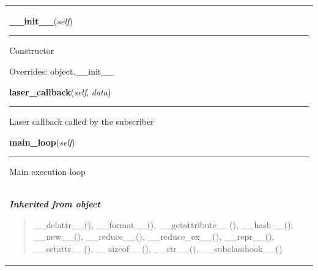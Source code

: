 \documentclass[12pt,a4paper]{scrartcl}
\newenvironment{algorithmframe}
{\begin{tabular}{|p{0.95\textwidth}}}%
{\end{tabular}}
\newlength{\funcindent}
\newlength{\funcwidth}
\begin{document}
\begin{algorithmframe}
\begin{boxedminipage}{\funcwidth}
    \raggedright \textbf{\_\_init\_\_}(\textit{self})

    \vspace{-1.5ex}

    \rule{\textwidth}{0.5\fboxrule}
\setlength{\parskip}{2ex}
    Constructor

\setlength{\parskip}{1ex}
      Overrides: object.\_\_init\_\_

    \end{boxedminipage}

    \label{intrudy:IntRudy:laser_callback}
    \index{intrudy \textit{(module)}!intrudy.IntRudy \textit{(class)}!intrudy.IntRudy.laser\_callback \textit{(method)}}

    \vspace{0.5ex}

\hspace{.8\funcindent}\begin{boxedminipage}{\funcwidth}

    \raggedright \textbf{laser\_callback}(\textit{self}, \textit{data})

    \vspace{-1.5ex}

    \rule{\textwidth}{0.5\fboxrule}
\setlength{\parskip}{2ex}
    Laser callback called by the subscriber

\setlength{\parskip}{1ex}
    \end{boxedminipage}

    \label{intrudy:IntRudy:main_loop}
    \index{intrudy \textit{(module)}!intrudy.IntRudy \textit{(class)}!intrudy.IntRudy.main\_loop \textit{(method)}}

    \vspace{0.5ex}

\hspace{.8\funcindent}\begin{boxedminipage}{\funcwidth}

    \raggedright \textbf{main\_loop}(\textit{self})

    \vspace{-1.5ex}

    \rule{\textwidth}{0.5\fboxrule}
\setlength{\parskip}{2ex}
    Main execution loop

\setlength{\parskip}{1ex}
    \end{boxedminipage}

\\

\normalsize{\textbf{\textit{Inherited from object}}}

\begin{quote}
\_\_delattr\_\_(), \_\_format\_\_(), \_\_getattribute\_\_(), \_\_hash\_\_(), \_\_new\_\_(), \_\_reduce\_\_(), \_\_reduce\_ex\_\_(), \_\_repr\_\_(), \_\_setattr\_\_(), \_\_sizeof\_\_(), \_\_str\_\_(), \_\_subclasshook\_\_()
\end{quote}

\end{algorithmframe}
\end{document}
